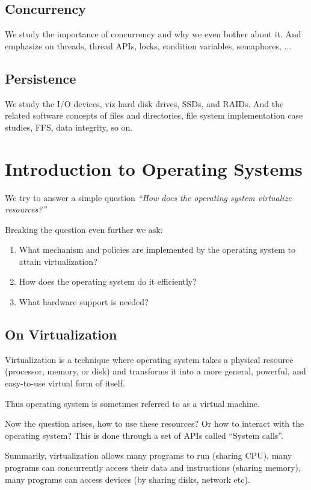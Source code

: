 \documentclass[10pt]{article}
\begin{document}
\subsection*{Concurrency}
We study the importance of concurrency and why we even bother about it. And
emphasize on threads, thread APIs, locks, condition variables, semaphores, ...

\subsection*{Persistence}
We study the I/O devices, viz hard disk drives, SSDs, and RAIDs. And the
related software concepts of files and directories, file system implementation
case studies, FFS, data integrity, so on.

\newpage
\section*{Introduction to Operating Systems}
We try to answer a simple question \emph{``How does the operating system
  virtualize resources?''}

Breaking the question even further we ask:
\begin{enumerate}
  \item What mechanism and policies are implemented by the operating system to
    attain virtualization?
  \item How does the operating system do it efficiently?
  \item What hardware support is needed?
\end{enumerate}

\subsection*{On Virtualization}
Virtualization is a technique where operating system takes a physical resource
(processor, memory, or disk) and transforms it into a more general, powerful,
and easy-to-use virtual form of itself.

Thus operating system is sometimes referred to as a virtual machine.

Now the question arises, how to use these resources? Or how to interact with the
operating system? This is done through a set of APIs called ``System calls''.

Summarily, virtualization allows many programs to run (sharing CPU), many
programs can concurrently access their data and instructions (sharing memory),
many programs can access devices (by sharing disks, network etc).
\end{document}
